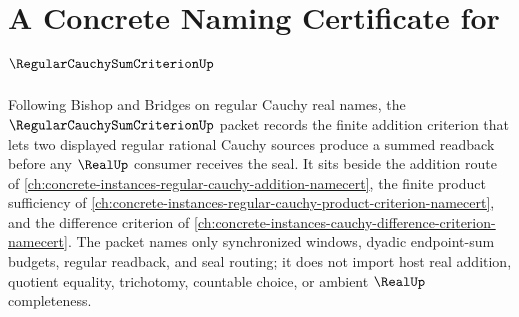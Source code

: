 \chapter{A Concrete Naming Certificate for $\RegularCauchySumCriterionUp$}
\label{ch:concrete-instances-regular-cauchy-sum-criterion-namecert}

Following Bishop and Bridges on regular Cauchy real names, the $\RegularCauchySumCriterionUp$ packet records the finite addition criterion that lets two displayed regular rational Cauchy sources produce a summed readback before any $\RealUp$ consumer receives the seal. It sits beside the addition route of \autoref{ch:concrete-instances-regular-cauchy-addition-namecert}, the finite product sufficiency of \autoref{ch:concrete-instances-regular-cauchy-product-criterion-namecert}, and the difference criterion of \autoref{ch:concrete-instances-cauchy-difference-criterion-namecert}. The packet names only synchronized windows, dyadic endpoint-sum budgets, regular readback, and seal routing; it does not import host real addition, quotient equality, trichotomy, countable choice, or ambient $\RealUp$ completeness.

